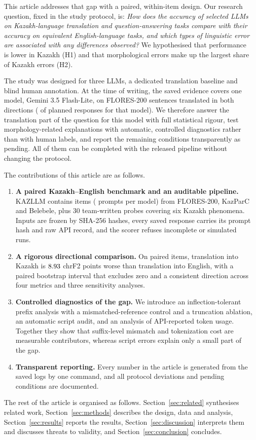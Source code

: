This article addresses that gap with a paired, within-item design. Our research question, fixed in the study protocol, is: \emph{How does the accuracy of selected LLMs on Kazakh-language translation and question-answering tasks compare with their accuracy on equivalent English-language tasks, and which types of linguistic error are associated with any differences observed?} We hypothesised that performance is lower in Kazakh (H1) and that morphological errors make up the largest share of Kazakh errors (H2).

The study was designed for three LLMs, a dedicated translation baseline and blind human annotation. At the time of writing, the saved evidence covers one model, Gemini 3.5 Flash-Lite, on \NPairs{} FLORES-200 sentences translated in both directions (\NResponses{} of \NPromptsPerModel{} planned responses for that model). We therefore answer the translation part of the question for this model with full statistical rigour, test morphology-related explanations with automatic, controlled diagnostics rather than with human labels, and report the remaining conditions transparently as pending. All of them can be completed with the released pipeline without changing the protocol.

The contributions of this article are as follows.
\begin{enumerate}
\item \textbf{A paired Kazakh--English benchmark and an auditable pipeline.} KAZLLM contains \NItems{} items (\NPromptsPerModel{} prompts per model) from FLORES-200, KazParC and Belebele, plus 30 team-written probes covering six Kazakh phenomena. Inputs are frozen by SHA-256 hashes, every saved response carries its prompt hash and raw API record, and the scorer refuses incomplete or simulated runs.
\item \textbf{A rigorous directional comparison.} On \NPairs{} paired items, translation into Kazakh is $8.93$ chrF2 points worse than translation into English, with a paired bootstrap interval that excludes zero and a consistent direction across four metrics and three sensitivity analyses.
\item \textbf{Controlled diagnostics of the gap.} We introduce an inflection-tolerant prefix analysis with a mismatched-reference control and a truncation ablation, an automatic script audit, and an analysis of API-reported token usage. Together they show that suffix-level mismatch and tokenization cost are measurable contributors, whereas script errors explain only a small part of the gap.
\item \textbf{Transparent reporting.} Every number in the article is generated from the saved logs by one command, and all protocol deviations and pending conditions are documented.
\end{enumerate}

The rest of the article is organised as follows. Section~\ref{sec:related} synthesises related work, Section~\ref{sec:methods} describes the design, data and analysis, Section~\ref{sec:results} reports the results, Section~\ref{sec:discussion} interprets them and discusses threats to validity, and Section~\ref{sec:conclusion} concludes.
